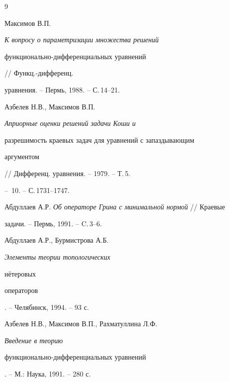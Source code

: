 \begin{thebibliography}{9} 


 




Максимов В.П. {\em К вопросу о параметризации множества решений 


функ\-ци\-о\-наль\-но-дифференциальных уравнений} // Функц.-дифференц. 


уравнения. -- Пермь, 1988. -- С.\,14--21. 




Азбелев Н.В., Максимов В.П. {\em Априорные оценки решений задачи Коши и 


разрешимость краевых задач для уравнений с запаздывающим 


аргументом} // Дифференц. уравнения. -- 1979. -- Т.\,5. 


-- \No\,10. -- С.\,1731--1747. 




Абдуллаев А.Р. {\em Об операторе Грина с минимальной нормой} // Краевые  


задачи. -- Пермь, 1991. -- C.\,3--6. 




Абдуллаев А.Р., Бурмистрова А.Б. {\em Элементы теории топологических 


н\"етеровых  


операторов}. -- Челябинск, 1994. -- 93 с. 




Азбелев Н.В., Максимов В.П., Рахматуллина Л.Ф. {\em Введение в теорию 


функционально-дифференциальных уравнений}. -- М.: Наука, 1991. -- 280 с. 


 


\end{thebibliography} 


 


\vskip 2cm 


 






 


\label{end} 


 


